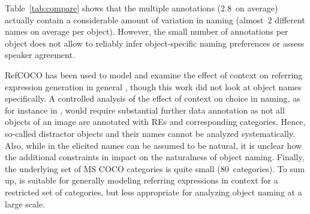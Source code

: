 Table~\ref{tab:compare} shows that the multiple annotations ($2.8$~on average) actually contain a considerable amount of variation in naming (almost~$2$ different names on average per object). 
However, the small number of annotations per object does not allow to reliably infer object-specific naming preferences or assess speaker agreement. 

RefCOCO has been used to model and examine the effect of context on referring expression generation in general \cite{Yu2016}, though this work did not look at object names specifically. 
A controlled analysis of the effect of context on choice in naming, as for instance in \cite{graf2016animal}, would require substantial further data annotation as not all objects of an image are annotated with REs and corresponding categories. Hence, so-called distractor objects  \cite{krahmer:2012} and their names cannot be analyzed systematically.
Also, while in  the elicited names can be assumed to be natural, it is unclear how the additional constraints in  impact on the naturalness of object naming.
Finally, the underlying set of MS COCO categories is quite small ($80$~categories).
To sum up,  is suitable for generally modeling referring expressions in context for a restricted set of categories, but less appropriate for analyzing object naming at a large scale.


